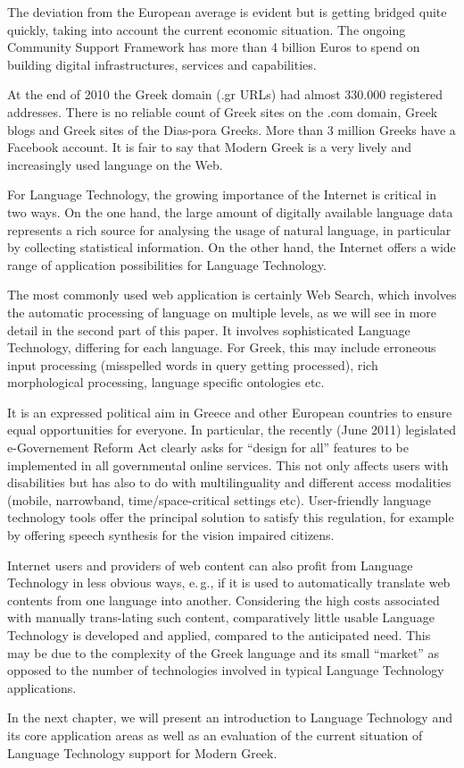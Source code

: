 \documentclass[]{../../metanetpaper}
\begin{document}
\begin{multicols}{2}
The deviation from the European average is evident but is getting bridged quite quickly, taking into account the current economic situation. The ongoing Community Support Framework has more than 4 billion Euros to spend on building digital infrastructures, services and capabilities.

At the end of 2010 the Greek domain (.gr URLs) had almost 330.000 registered addresses. There is no reliable count of Greek sites on the .com domain, Greek blogs and Greek sites of the Dias-pora Greeks. More than 3 million Greeks have a Facebook account. It is fair to say that Modern Greek is a very lively and increasingly used language on the Web.

For Language Technology, the growing importance of the Internet is critical in two ways. On the one hand, the large amount of digitally available language data represents a rich source for analysing the usage of natural language, in particular by collecting statistical information. On the other hand, the Internet offers a wide range of application possibilities for Language Technology.

The most commonly used web application is certainly Web Search, which involves the automatic processing of language on multiple levels, as we will see in more detail in the second part of this paper. It involves sophisticated Language Technology, differing for each language. For Greek, this may include erroneous input processing (misspelled words in query getting processed), rich morphological processing, language specific ontologies etc.

It is an expressed political aim in Greece and other European countries to ensure equal opportunities for everyone. In particular, the recently (June 2011) legislated e-Governement Reform Act clearly asks for “design for all” features to be implemented in all governmental online services. This not only affects users with disabilities but has also to do with multilinguality and different access modalities (mobile, narrowband, time/space-critical settings etc). User-friendly language technology tools offer the principal solution to satisfy this regulation, for example by offering speech synthesis for the vision impaired citizens.

Internet users and providers of web content can also profit from Language Technology in less obvious ways, e.\,g., if it is used to automatically translate web contents from one language into another. Considering the high costs associated with manually trans-lating such content, comparatively little usable Language Technology is developed and applied, compared to the anticipated need. This may be due to the complexity of the Greek language and its small “market” as opposed to the number of technologies involved in typical Language Technology applications. 

In the next chapter, we will present an introduction to Language Technology and its core application areas as well as an evaluation of the current situation of Language Technology support for Modern Greek.
\end{multicols}
\end{document}
